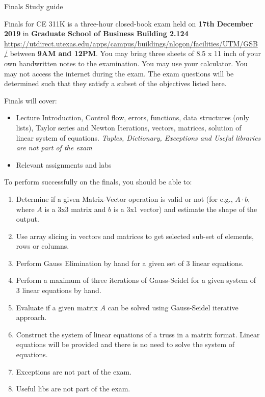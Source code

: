 \documentclass[]{article}
\begin{document}
\begin{center}
\Large Finals Study guide
\end{center}

Finals for CE 311K is a three-hour closed-book exam held on \textbf{17th December 2019} in \textbf{Graduate School of Business Building 2.124} \url{https://utdirect.utexas.edu/apps/campus/buildings/nlogon/facilities/UTM/GSB/} between \textbf{9AM and 12PM}. You may bring three sheets of 8.5 x 11 inch of your own handwritten notes to the examination. You may use your calculator. You may not access the internet during the exam. The exam questions will be determined such that they satisfy a subset of the objectives listed here.

Finals will cover:
\begin{itemize}
	\item Lecture Introduction, Control flow, errors, functions, data structures (only lists), Taylor series and Newton Iterations, vectors, matrices, solution of linear system of equations. \textit{Tuples, Dictionary, Exceptions and Useful libraries are not part of the exam}
	\item Relevant assignments and labs
\end{itemize}

To perform successfully on the finals, you should be able to:

\begin{enumerate}
	\item Determine if a given Matrix-Vector operation is valid or not (for e.g., $A\cdot b$, where $A$ is a 3x3 matrix and $b$ is a 3x1 vector) and estimate the shape of the output.
	\item Use array slicing in vectors and matrices to get selected sub-set of elements, rows or columns.
	\item Perform Gauss Elimination by hand for a given set of 3 linear equations.
	\item Perform a maximum of three iterations of Gauss-Seidel for a given system of 3 linear equations by hand.
	\item Evaluate if a given matrix $A$ can be solved using Gauss-Seidel iterative approach.
	\item Construct the system of linear equations of a truss in a matrix format. Linear equations will be provided and there is no need to solve the system of equations.
	\item Exceptions are not part of the exam.
	\item Useful libs are not part of the exam.
\end{enumerate}
\end{document}
